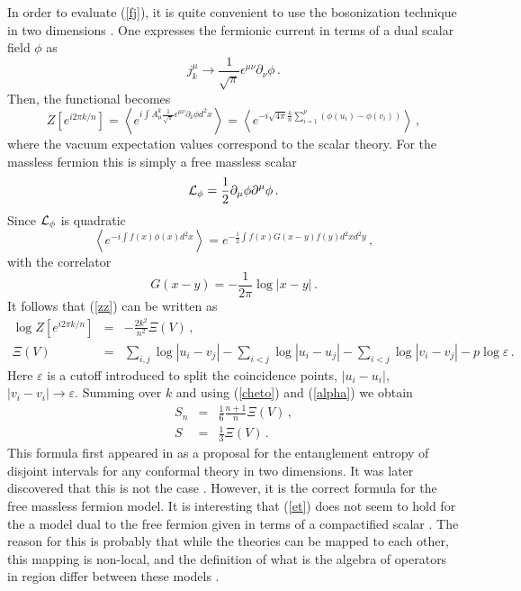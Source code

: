 \documentclass[11pt]{article}
\begin{document}
In order to evaluate (\ref{fj}), it is quite convenient to use the
bosonization technique in two dimensions \cite{fermion}. 
One expresses the fermionic current in terms of a dual scalar field $\phi$ as 
\begin{equation}
j_{k}^{\mu }\to \frac{1}{\sqrt{\pi }}\epsilon ^{\mu \nu }\partial_{\nu}\phi\,.
\end{equation}
Then, the functional becomes
\begin{equation}
Z[e^{i 2 \pi k/n}]=\left\langle e^{i\int A_{\mu }^{k}\frac{1}{\sqrt{\pi }}\epsilon ^{\mu
\nu }\partial _{\nu}\phi d^{2}x}\right\rangle =\left\langle e^{-i\sqrt{4\pi }
\frac{k}{n}\sum_{i=1}^{p}\left( \phi (u_{i})-\phi (v_{i})\right)
}\right\rangle \,,
\label{zz}
\end{equation}
where the vacuum expectation values correspond to the scalar
theory.  For the massless fermion this is simply a free massless scalar
\begin{equation}
{\cal L}_\phi=\frac{1}{2} \partial_\mu \phi \partial ^\mu \phi\,.
\end{equation}
 Since ${\cal L}_\phi$ is quadratic
\begin{equation}
\left\langle e^{-i\int f(x)\phi (x)d^{2}x}\right\rangle =e^{-\frac{1}{2}\int
f(x)G(x-y)f(y)d^{2}xd^{2}y}\,,
\end{equation}
with the correlator 
\begin{equation}
G(x-y)=-\frac{1}{2\pi }\log \left| x-y\right| \,.
\end{equation}
It follows that (\ref{zz}) can be written as
\begin{eqnarray}
\log Z[e^{i 2 \pi k/n}] &=&-\frac{2k^{2}}{n^{2}}\Xi \left( V\right) \,, \\
\Xi \left( V\right) &=&\sum_{i,j}\log
\left| u_{i}-v_{j}\right|-\sum_{i<j}\log \left|
u_{i}-u_{j}\right| -\sum_{i<j}\log \left| v_{i}-v_{j}\right|  -p\log \varepsilon  \,.
\end{eqnarray}
Here $\varepsilon $ is a cutoff introduced to split the coincidence points, $
\left| u_{i}-u_{i}\right| $, $\left| v_{i}-v_{i}\right| \to \varepsilon $. Summing
over $k$ and using (\ref{cheto}) and (\ref{alpha}) we obtain
\begin{eqnarray}
S_n &=& \frac{1}{6} \frac{n+1}{n}
 \Xi \left( V\right) \,,\label{popopo} \\
S &=&\frac{1}{3}\Xi \left( V\right) \,.  \label{et}
\end{eqnarray}
This formula first appeared in \cite{cc} as a proposal for the entanglement
entropy of disjoint intervals for any conformal theory in two dimensions. It was later discovered that this is not the case \cite{cg}. However, it is the correct formula for the free massless fermion model. It is interesting that (\ref{et}) does not seem to hold for the a model dual to the free fermion given in terms of a compactified scalar \cite{rems}. The reason for this is probably that while the theories can be mapped to each other, this mapping is non-local, and the definition of what is the algebra of operators in region differ between these models \cite{furu}. 
\end{document}
